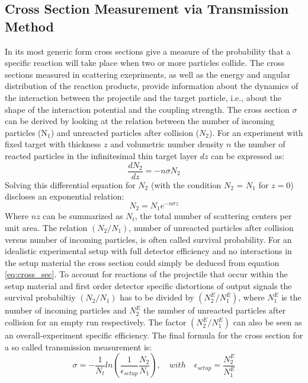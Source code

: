 \subsection{Cross Section Measurement via Transmission Method}
In its most generic form cross sections give a measure of the probability that a specific reaction will take place when two or more particles collide. The cross sections  measured in scattering exepriments, as well as the energy and angular distribution of the reaction products, provide information about the dynamics of the interaction between the projectile and the target particle, i.e., about the shape of the interaction potential and the coupling strength.\newline
The cross section $\sigma$ can be derived by looking at the relation between the number of incoming particles (N$_{1}$) and unreacted particles after collision ($N_{2}$). For an experiment with fixed target with thickness $z$ and volumetric number density $n$ the number of reacted particles in the infinitesimal thin target layer $dz$ can be expressed as:
\begin{equation}
\frac{dN_{2}}{dz} = -n \sigma N_{2}
\end{equation}
Solving this differential equation for $N_{2}$ (with the condition $N_{2}$ = $N_{1}$ for $z=0$) discloses an exponential relation:
\begin{equation}
N_{2} = N_{1}e^{-n\sigma z}
\label{eq:cross_sec}
\end{equation} 
Where $n z$ can be summarized as $N_t$, the total number of scattering centers per unit area. The relation $(N_{2}/N_{1})$, number of unreacted particles after collision versus number of incoming particles, is often called survival probability. For an idealistic experimental setup with full detector efficiency and no interactions in the setup material the cross section could simply be deduced from equation \ref{eq:cross_sec}. To account for reactions of the projectile that occur within the setup material and first order detector specific distortions of output signals the survival probabiltiy $(N_{2}/N_{1})$ has to be divided by $(N_{2}^E/N_{1}^E)$, where $N_{1}^E$ is the number of incoming particles and $N_{2}^E$ the number of unreacted particles after collision for an empty run respectively. The factor $(N_{2}^E/N_{1}^E)$ can also be seen as an overall-experiment specific efficiency. The final formula for the cross section for a so called transmission measurement is:
\begin{equation}
\sigma = -\frac{1}{N_t} ln(\frac{1}{\epsilon_{setup}} \frac{N_2}{N_1}),\quad with \quad  \epsilon_{setup} = \frac{N_{2}^E}{N_{1}^E}
\label{eq:corr_cross}
\end{equation}
